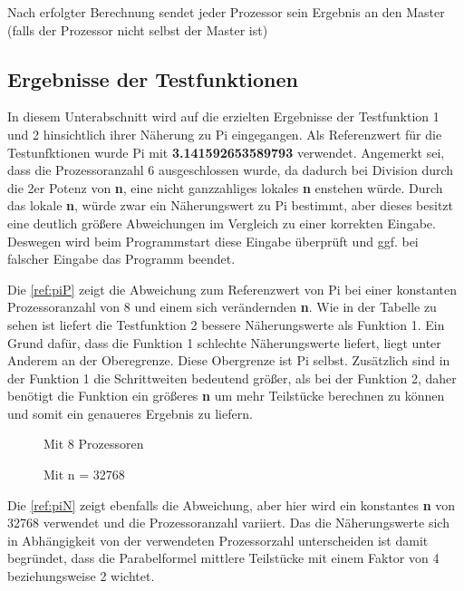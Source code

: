 Nach erfolgter Berechnung sendet jeder Prozessor sein Ergebnis an den Master (falls der Prozessor nicht selbst der Master ist)

\subsection{Ergebnisse der Testfunktionen}
In diesem Unterabschnitt wird auf die erzielten Ergebnisse der Testfunktion 1 und 2 hinsichtlich ihrer Näherung zu Pi eingegangen.
Als Referenzwert für die Testunfktionen wurde Pi mit \textbf{3.141592653589793} verwendet.
Angemerkt sei, dass die Prozessoranzahl 6 ausgeschlossen wurde, da dadurch bei Division durch die 2er Potenz von \textbf{n}, eine nicht ganzzahliges lokales \textbf{n} enstehen würde.
Durch das lokale \textbf{n}, würde zwar ein Näherungswert zu Pi bestimmt, aber dieses besitzt eine deutlich größere Abweichungen im Vergleich zu einer korrekten Eingabe.
Deswegen wird beim Programmstart diese Eingabe überprüft und ggf. bei falscher Eingabe das Programm beendet.

Die \autoref{ref:piP} zeigt die Abweichung zum Referenzwert von Pi bei einer konstanten Prozessoranzahl von 8 und einem sich verändernden \textbf{n}.
Wie in der Tabelle zu sehen ist liefert die Testfunktion 2 bessere Näherungswerte als Funktion 1.
Ein Grund dafür, dass die Funktion 1 schlechte Näherungswerte liefert, liegt unter Anderem an der Oberegrenze.
Diese Obergrenze ist Pi selbst.
Zusätzlich sind in der Funktion 1 die Schrittweiten bedeutend größer, als bei der Funktion 2, daher benötigt die Funktion ein größeres \textbf{n} um mehr Teilstücke berechnen zu können und somit ein genaueres Ergebnis zu liefern.
\begin{figure}[h]
\begin{minipage}{0.45\textwidth}
	\caption{Mit 8 Prozessoren}
	\label{ref:piP}
\end{minipage}
\hfill
\begin{minipage}{0.45\textwidth}
	\caption{Mit n = 32768}
	\label{ref:piN}
\end{minipage}
\end{figure}
Die \autoref{ref:piN} zeigt ebenfalls die Abweichung, aber hier wird ein konstantes \textbf{n} von 32768 verwendet und die Prozessoranzahl variiert.
Das die Näherungswerte sich in Abhängigkeit von der verwendeten Prozessorzahl unterscheiden ist damit begründet, dass die Parabelformel mittlere Teilstücke mit einem Faktor von 4 beziehungsweise 2 wichtet.

